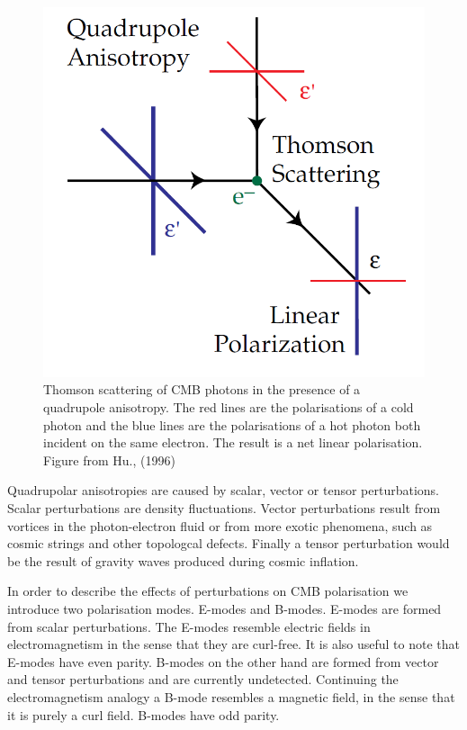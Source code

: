 \begin{figure}[h]
\centering
\includegraphics[scale=0.35]{images/thomson.png}
\caption{Thomson scattering of CMB photons in the presence of a quadrupole anisotropy. The red lines are the polarisations of a cold photon and the blue lines are the polarisations of a hot photon both incident on the same electron. The result is a net linear polarisation. Figure from Hu., (1996) \cite{Hu:1997hv}}
\label{fig:thomson}
\end{figure}

Quadrupolar anisotropies are caused by scalar, vector or tensor perturbations. Scalar perturbations are density fluctuations. Vector perturbations result from vortices in the photon-electron fluid or from more exotic phenomena, such as cosmic strings and other topologcal defects. Finally a tensor perturbation would be the result of gravity waves produced during cosmic inflation.  

In order to describe the effects of perturbations on CMB polarisation we introduce two polarisation modes. E-modes and B-modes. E-modes are formed from scalar perturbations. The E-modes resemble electric fields in electromagnetism in the sense that they are curl-free. It is also useful to note that E-modes have even parity. B-modes on the other hand are formed from vector and tensor perturbations and are currently undetected. Continuing the electromagnetism analogy a B-mode resembles a magnetic field, in the sense that it is purely a curl field. B-modes have odd parity.

